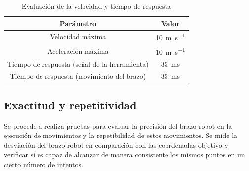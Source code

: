 \begin{table}[H]
\begin{center}
\begin{tabular}{|c|c|}
\hline
\textbf{Parámetro} & \textbf{Valor} \\
\hline
Velocidad máxima & \SI{10}{\meter\per\second}\\
Aceleración máxima & \SI{10}{\meter\per\second}\\
Tiempo de respuesta (señal de la herramienta) & \SI{35}{\milli\second} \\
Tiempo de respuesta (movimiento del brazo) & \SI{35}{\milli\second} \\
\hline
\end{tabular}
\caption{Evaluación de la velocidad y tiempo de respuesta}
\label{cuadro:evaluacion_velocidad}
\end{center}
\end{table}

\subsection{Exactitud y repetitividad} 
Se procede a realiza pruebas para evaluar la precisión del brazo robot en la ejecución de movimientos y la repetibilidad 
de estos movimientos. Se mide la desviación del brazo robot en comparación con las coordenadas objetivo y verificar si 
es capaz de alcanzar de manera consistente los mismos puntos en un cierto número de intentos.

